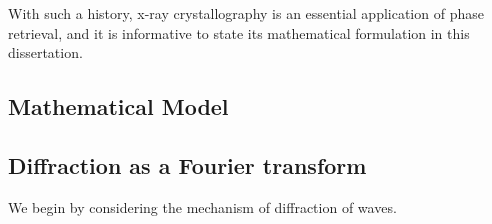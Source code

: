 With such a history, x-ray crystallography is an essential application of phase retrieval, and it is %
informative to state its mathematical formulation in this dissertation.

\subsection{Mathematical Model}

\subsection{Diffraction as a Fourier transform}
We begin by considering the mechanism of diffraction of waves.  

